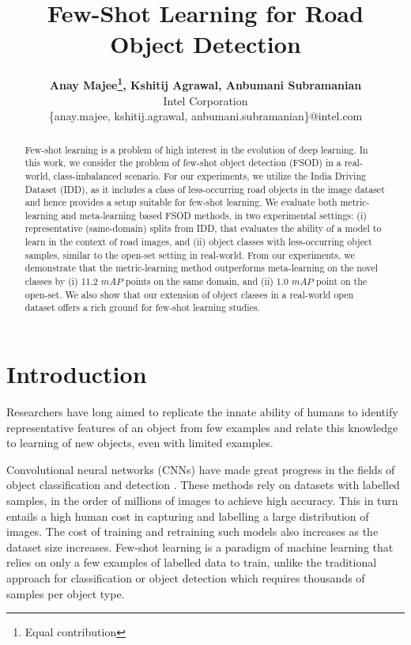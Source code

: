 \documentclass[letterpaper]{article} %
\title{Few-Shot Learning for Road Object Detection}
\author{
\Large \textbf{
Anay Majee\thanks{Equal contribution},
Kshitij Agrawal\footnotemark[1],
Anbumani Subramanian
} \\
Intel Corporation\\
\{anay.majee, kshitij.agrawal, anbumani.subramanian\}@intel.com
}
\begin{document}
\maketitle

\begin{abstract}
Few-shot learning is a problem of high interest in the evolution of deep learning. In this work, we consider the problem of few-shot object detection (FSOD) in a real-world, class-imbalanced scenario. For our experiments, we utilize the India Driving Dataset (IDD), as it includes a class of less-occurring road objects in the image dataset and hence provides a setup suitable for few-shot learning. We evaluate both metric-learning and meta-learning based FSOD methods, in two experimental settings: (i) representative (same-domain) splits from IDD, that evaluates the ability of a model to learn in the context of road images, and (ii) object classes with less-occurring object samples, similar to the open-set setting in real-world. From our experiments, we demonstrate that the metric-learning method outperforms meta-learning on the novel classes by (i) 11.2 $mAP$ points on the same domain, and (ii) 1.0 $mAP$ point on the open-set. We also show that our extension of object classes in a real-world open dataset offers a rich ground for few-shot learning studies.
\end{abstract}

\section{Introduction}

Researchers have long aimed to replicate the innate ability of humans to identify representative features of an object from few examples and relate this knowledge to learning of new objects, even with limited examples.

Convolutional neural networks (CNNs) have made great progress in the fields of object classification \cite{resnet} and detection \cite{yolo1,ssd,faster-rcnn}. These methods rely on datasets with labelled samples, in the order of millions of images to achieve high accuracy. This in turn entails a high human cost in capturing and labelling a large distribution of images. The cost of training and retraining such models also increases as the dataset size increases. Few-shot learning is a paradigm of machine learning that relies on only a few examples of labelled data to train, unlike the traditional approach for classification or object detection which requires thousands of samples per object type.
\end{document}
